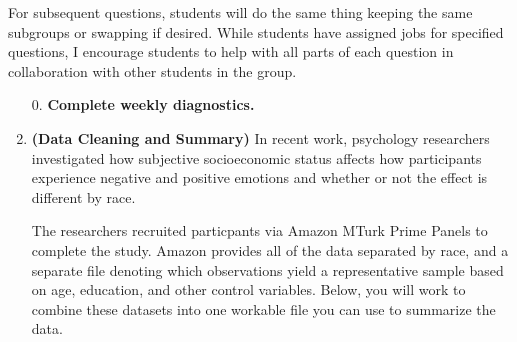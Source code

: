 \documentclass{article}
\begin{document}
For subsequent questions, students will do the same thing keeping the same subgroups
or swapping if desired. While students have assigned jobs for specified questions, 
I encourage students to help with all parts of each question in collaboration with 
other students in the group.
\newpage

\begin{enumerate}
  \item[0.] \textbf{Complete weekly diagnostics.}
\item \textbf{(Data Cleaning and Summary)} In recent work, psychology researchers 
investigated how subjective socioeconomic status affects how participants experience
negative and positive emotions and whether or not the effect is different by race. 

The researchers recruited particpants via Amazon MTurk Prime Panels to complete the 
study. Amazon provides all of the data separated by race, and a separate file denoting 
which observations yield a representative sample based on age, education, and other 
control variables. Below, you will work to combine these datasets into one workable
file you can use to summarize the data.


\end{enumerate}
\end{document}
